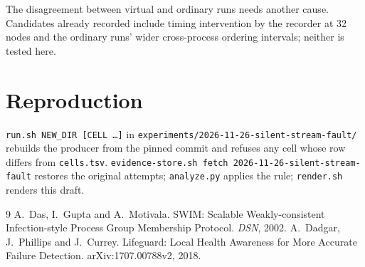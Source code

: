 \documentclass[10pt]{article}
\begin{document}
The disagreement between virtual and ordinary runs needs another cause.
Candidates already recorded include timing intervention by the recorder at
32 nodes and the ordinary runs' wider cross-process ordering intervals;
neither is tested here.

\section{Reproduction}
\texttt{run.sh NEW\_DIR [CELL \ldots]} in
\texttt{experiments/2026-11-26-silent-stream-fault/} rebuilds the producer
from the pinned commit and refuses any cell whose row differs from
\texttt{cells.tsv}. \texttt{evidence-store.sh fetch
2026-11-26-silent-stream-fault} restores the original attempts;
\texttt{analyze.py} applies the rule; \texttt{render.sh} renders this
draft.

\begin{thebibliography}{9}
 A.~Das, I.~Gupta and A.~Motivala. SWIM: Scalable
Weakly-consistent Infection-style Process Group Membership Protocol.
\emph{DSN}, 2002.
 A.~Dadgar, J.~Phillips and J.~Currey. Lifeguard: Local
Health Awareness for More Accurate Failure Detection. arXiv:1707.00788v2,
2018.
\end{thebibliography}
\end{document}
